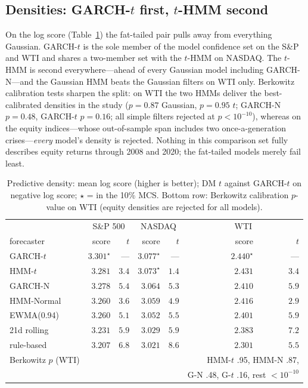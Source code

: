 \documentclass[11pt]{article}
\begin{document}
\subsection{Densities: GARCH-$t$ first, $t$-HMM second}
On the log score (Table~\ref{tab:logscore}) the fat-tailed pair pulls away
from everything Gaussian. GARCH-$t$ is the sole member of the model
confidence set on the S\&P and WTI and shares a two-member set with the
$t$-HMM on NASDAQ. The $t$-HMM is second everywhere---ahead of every
Gaussian model including GARCH-N---and the Gaussian HMM beats the Gaussian
filters on WTI only. Berkowitz calibration tests sharpen the split: on WTI
the two HMMs deliver the best-calibrated densities in the study
($p=0.87$ Gaussian, $p=0.95$ $t$; GARCH-N $p=0.48$, GARCH-$t$ $p=0.16$;
all simple filters rejected at $p<10^{-10}$), whereas on the equity
indices---whose out-of-sample span includes two once-a-generation
crises---\emph{every} model's density is rejected. Nothing in this
comparison set fully describes equity returns through 2008 and 2020; the
fat-tailed models merely fail least.

\begin{table}[t]
\centering
\caption{Predictive density: mean log score (higher is better); DM $t$
against GARCH-$t$ on negative log score; $\star$ = in the 10\% MCS.
Bottom row: Berkowitz calibration $p$-value on WTI (equity densities are
rejected for all models).}
\label{tab:logscore}
\begin{tabular}{lrrrrrr}
\toprule
& \multicolumn{2}{c}{S\&P 500} & \multicolumn{2}{c}{NASDAQ}
& \multicolumn{2}{c}{WTI} \\
forecaster & score & $t$ & score & $t$ & score & $t$ \\
\midrule
GARCH-$t$   & $\mathbf{3.301}^\star$ & --- & $\mathbf{3.077}^\star$ & --- & $\mathbf{2.440}^\star$ & --- \\
HMM-$t$     & $3.281$ & $3.4$ & $3.073^\star$ & $1.4$ & $2.431$ & $3.4$ \\
GARCH-N     & $3.278$ & $5.4$ & $3.064$ & $5.3$ & $2.410$ & $5.9$ \\
HMM-Normal  & $3.260$ & $3.6$ & $3.059$ & $4.9$ & $2.416$ & $2.9$ \\
EWMA(0.94)  & $3.260$ & $5.1$ & $3.052$ & $5.5$ & $2.401$ & $5.9$ \\
21d rolling & $3.231$ & $5.9$ & $3.029$ & $5.9$ & $2.383$ & $7.2$ \\
rule-based  & $3.207$ & $6.8$ & $3.021$ & $8.6$ & $2.301$ & $5.5$ \\
\midrule
Berkowitz $p$ (WTI) & & & & & \multicolumn{2}{r}{HMM-$t$ .95, HMM-N .87,}\\
& & & & & \multicolumn{2}{r}{G-N .48, G-$t$ .16, rest $<10^{-10}$}\\
\bottomrule
\end{tabular}
\end{table}
\end{document}
